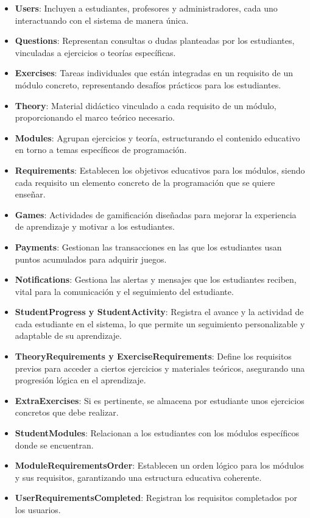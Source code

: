 \begin{itemize}
    \item \textbf{Users}: Incluyen a estudiantes, profesores y administradores, cada uno interactuando con el sistema de manera única.
    \item \textbf{Questions}: Representan consultas o dudas planteadas por los estudiantes, vinculadas a ejercicios o teorías específicas.
    \item \textbf{Exercises}: Tareas individuales que están integradas en un requisito de un módulo concreto, representando desafíos prácticos para los estudiantes.
    \item \textbf{Theory}: Material didáctico vinculado a cada requisito de un módulo, proporcionando el marco teórico necesario.
    \item \textbf{Modules}: Agrupan ejercicios y teoría, estructurando el contenido educativo en torno a temas específicos de programación.
    \item  \textbf{Requirements}: Establecen los objetivos educativos para los módulos, siendo cada requisito un elemento concreto de la programación que se quiere enseñar.
    \item \textbf{Games}: Actividades de gamificación diseñadas para mejorar la experiencia de aprendizaje y motivar a los estudiantes.
    \item \textbf{Payments}: Gestionan las transacciones en las que los estudiantes usan puntos acumulados para adquirir juegos.
    \item \textbf{Notifications}: Gestiona las alertas y mensajes que los estudiantes reciben, vital para la comunicación y el seguimiento del estudiante.
    \item \textbf{StudentProgress y StudentActivity}: Registra el avance y la actividad de cada estudiante en el sistema, lo que permite un seguimiento personalizable y adaptable de su aprendizaje.
    \item \textbf{TheoryRequirements y ExerciseRequirements}: Define los requisitos previos para acceder a ciertos ejercicios y materiales teóricos, asegurando una progresión lógica en el aprendizaje.
    \item \textbf{ExtraExercises}: Si es pertinente, se almacena por estudiante unos ejercicios concretos que debe realizar.
    \item \textbf{StudentModules}: Relacionan a los estudiantes con los módulos específicos donde se encuentran. 
    \item \textbf{ModuleRequirementsOrder}: Establecen un orden lógico para los módulos y sus requisitos, garantizando una estructura educativa coherente.
    \item \textbf{UserRequirementsCompleted}: Registran los requisitos completados por los usuarios.
\end{itemize}

